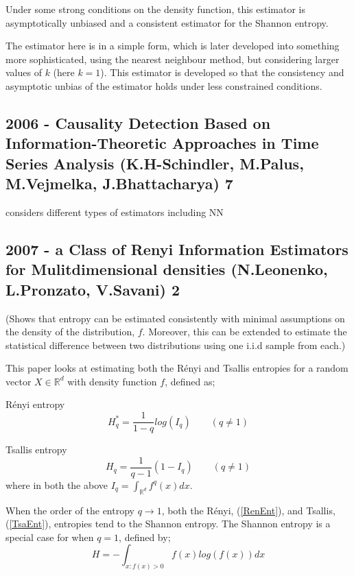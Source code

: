 \documentclass{article}
\begin{document}
Under some strong conditions on the density function, this estimator is asymptotically unbiased and a consistent estimator for the Shannon entropy. 

The estimator here is in a simple form, which is later developed into something more sophisticated, using the nearest neighbour method, but considering larger values of $k$ (here $k=1$). This estimator is developed so that the consistency and asymptotic unbias of the estimator holds under less constrained conditions.




 


\subsection{2006 - Causality Detection Based on Information-Theoretic Approaches in Time Series Analysis (K.H-Schindler, M.Palus, M.Vejmelka, J.Bhattacharya) 7}

considers different types of estimators including NN






\subsection{2007 - a Class of Renyi Information Estimators for Mulitdimensional densities (N.Leonenko, L.Pronzato, V.Savani) 2}

(Shows that entropy can be estimated consistently with minimal assumptions on the density of the distribution, $f$. Moreover, this can be extended to estimate the statistical difference between two distributions using one i.i.d sample from each.)

This paper looks at estimating both the R\'enyi and Tsallis entropies for a random vector $X \in \mathbb{R}^d$ with density function $f$, defined as;

R\'enyi entropy
\begin{equation}
H_{q}^{*} = \frac{1}{1-q} log(I_{q}) \quad  \quad (q \neq 1) \label{RenEnt} 
\end{equation}

Tsallis entropy
\begin{equation}
H_{q} = \frac{1}{q-1} (1 -  I_{q}) \quad  \quad (q \neq 1) \label{TsaEnt} 
\end{equation}
where in both the above $I_{q} = \int_{\mathbb{R}^d} f^q (x) dx$.

When the order of the entropy $q \to 1$, both the R\'enyi, (\ref{RenEnt}), and Tsallis, (\ref{TsaEnt}), entropies tend to the Shannon entropy. The Shannon entropy is a special case for when $q=1$, defined by;
\begin{equation} 
H = - \int_{x : f(x) > 0} f(x) log(f(x)) dx \label{ShaEnt} 
\end{equation} 
\end{document}
